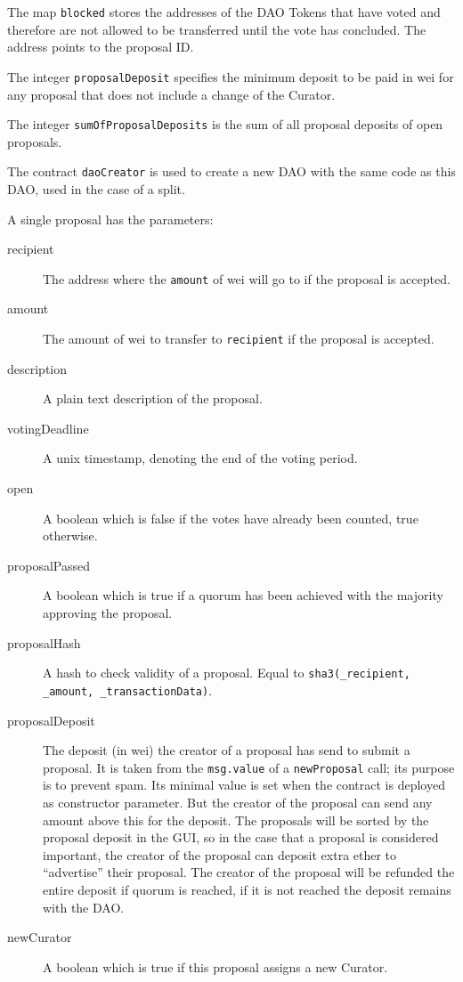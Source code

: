 \documentclass[9pt,oneside]{amsart}
\begin{document}
\begin{multicols}{2}
The map \verb|blocked| stores the addresses of the DAO Tokens that have voted and therefore are not allowed to be transferred until the vote has concluded. The address points to the proposal ID.

The integer \verb|proposalDeposit| specifies the minimum deposit to be paid in wei for any proposal that does not include a change of the Curator.

The integer \verb|sumOfProposalDeposits| is the sum of all proposal deposits of open proposals.

The contract \verb|daoCreator| is used to create a new DAO with the same code as this DAO, used in the case of a split.

A single proposal has the parameters:
\begin{description}
 \item[recipient] The address where the \verb|amount| of wei will go to if the proposal is accepted.
 \item[amount] The amount of wei to transfer to \verb|recipient| if the proposal is accepted.
 \item[description] A plain text description of the proposal.
 \item[votingDeadline] A unix timestamp, denoting the end of the voting period.
 \item[open] A boolean which is false if the votes have already been counted, true otherwise.
 \item[proposalPassed] A boolean which is true if a quorum has been achieved with the majority approving the proposal.
 \item[proposalHash] A hash to check validity of a proposal. Equal to \verb|sha3(_recipient, _amount, _transactionData)|.
 \item[proposalDeposit] The deposit (in wei) the creator of a proposal has send to submit a proposal. It is taken from the \verb|msg.value| of a \verb|newProposal| call; its purpose is to prevent spam. Its minimal value is set when the contract is deployed as constructor parameter. But the creator of the proposal can send any amount above this for the deposit. The proposals will be sorted by the proposal deposit in the GUI, so in the case that a proposal is considered important, the creator of the proposal can deposit extra ether to “advertise” their proposal. The creator of the proposal will be refunded the entire deposit if quorum is reached, if it is not reached the deposit remains with the DAO. 
 \item[newCurator] A boolean which is true if this proposal assigns a new Curator.

\end{description}
\end{multicols}
\end{document}
